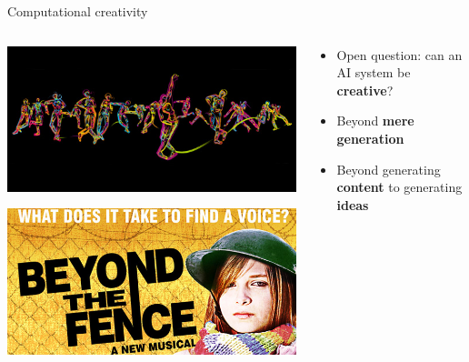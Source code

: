\begin{frame}{Computational creativity}
	\begin{columns}
		\begin{column}{0.4\textwidth}
			\pause\includegraphics[width=\textwidth]{paintingfool}
			
			\vspace{2ex}
			
			\pause\includegraphics[width=\textwidth]{beyondthefence}
		\end{column}
		\begin{column}{0.55\textwidth}
			\begin{itemize}
				\pause\item Open question: can an AI system be \textbf{creative}?
				\pause\item Beyond \textbf{mere generation}
				\pause\item Beyond generating \textbf{content} to generating \textbf{ideas}
			\end{itemize}
		\end{column}
	\end{columns}
\end{frame}
